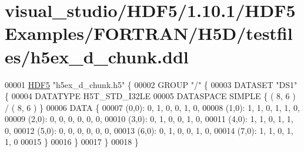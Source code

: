 \hypertarget{visual__studio_2_h_d_f5_21_810_81_2_h_d_f5_examples_2_f_o_r_t_r_a_n_2_h5_d_2testfiles_2h5ex__d__chunk_8ddl_source}{}\section{visual\+\_\+studio/\+H\+D\+F5/1.10.1/\+H\+D\+F5\+Examples/\+F\+O\+R\+T\+R\+A\+N/\+H5\+D/testfiles/h5ex\+\_\+d\+\_\+chunk.ddl}
\label{visual__studio_2_h_d_f5_21_810_81_2_h_d_f5_examples_2_f_o_r_t_r_a_n_2_h5_d_2testfiles_2h5ex__d__chunk_8ddl_source}

\begin{DoxyCode}
00001 \hyperlink{namespace_h_d_f5}{HDF5} \textcolor{stringliteral}{"h5ex\_d\_chunk.h5"} \{
00002 GROUP \textcolor{stringliteral}{"/"} \{
00003    DATASET \textcolor{stringliteral}{"DS1"} \{
00004       DATATYPE  H5T\_STD\_I32LE
00005       DATASPACE  SIMPLE \{ ( 8, 6 ) / ( 8, 6 ) \}
00006       DATA \{
00007       (0,0): 0, 1, 0, 0, 1, 0,
00008       (1,0): 1, 1, 0, 1, 1, 0,
00009       (2,0): 0, 0, 0, 0, 0, 0,
00010       (3,0): 0, 1, 0, 0, 1, 0,
00011       (4,0): 1, 1, 0, 1, 1, 0,
00012       (5,0): 0, 0, 0, 0, 0, 0,
00013       (6,0): 0, 1, 0, 0, 1, 0,
00014       (7,0): 1, 1, 0, 1, 1, 0
00015       \}
00016    \}
00017 \}
00018 \}
\end{DoxyCode}
